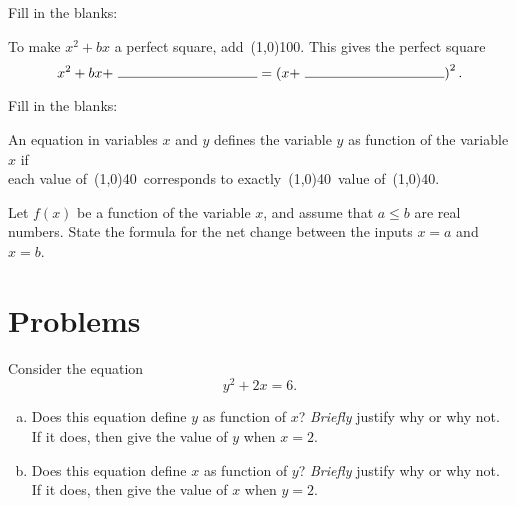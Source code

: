 \documentclass[12pt]{amsart}
\begin{document}
\newpage

\begin{thm}[3 Points]\label{ex4}
  Fill in the blanks:\\
  \begin{center}
    To make $x^2 + bx$ a perfect square, add\ \line(1,0){100}.
    This gives the perfect square
    \vspace{.5in}
    $$x^2 + bx +\ \line(1,0){100} = \left(x +\ \line(1,0){100}\right)^2.$$
  \end{center}
\end{thm}
\vspace{.5in}
\begin{thm}[3 Points]\label{ex5}
  Fill in the blanks:\\
  \begin{center}
    An equation in variables $x$ and $y$ defines the variable $y$ as function of the variable $x$ if\\
    \vspace{.2in}
    each value of\ \line(1,0){40}\ corresponds to exactly\ \line(1,0){40}\ value of\ \line(1,0){40}.
  \end{center}
  \vspace{1in}
\end{thm}
\vspace{.5in}
\begin{thm}[3 Points]\label{ex6}
  Let $f(x)$ be a function of the variable $x$, and assume that $a \leq b$ are real numbers.
  State the formula for the net change between the inputs $x = a$ and $x = b$.
\end{thm}

\newpage
\section{Problems}
\begin{thm}[16 Points]\label{ex7}
  Consider the equation
  $$y^2 + 2x = 6.$$
  \begin{enumerate}[(a)]
    \item
      Does this equation define $y$ as function of $x$?  
      \emph{Briefly} justify why or why not.
      If it does, then give the value of $y$ when $x = 2$.
      \vspace{2in}
    \item
      Does this equation define $x$ as function of $y$?  \emph{Briefly} justify why or why not.
      If it does, then give the value of $x$ when $y = 2$.
      \vspace{2in}
  \end{enumerate}
\end{thm}
\end{document}
